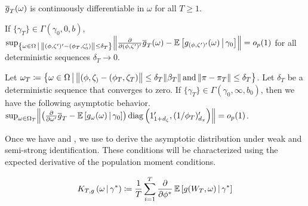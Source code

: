 \documentclass[11pt, letterpaper, twoside, final]{article}
\begin{document}
\begin{appendices}
  
  
  \begin{assump}[GMM 2*]\label{ass:GMM2}
  \begin{assumplist}
    \item $\overline{g}_T(\omega)$ is continuously differentiable in $\omega$ for all $T \geq 1$. 
      \label{ass:GMM2a}
    \item If $\{\gamma_T\} \in \Gamma\left(\gamma_0, 0, b\right)$, $\sup_{\left\lbrace \omega \in \Omega \mvert
      \norm*{(\phi, \zeta')' - (\phi_T, \zeta_0')} \leq \delta_T \right\rbrace}
      \norm*{\frac{\partial}{\partial (\phi, \zeta')'} \sampmom(\omega) - \E\left[\popmom_{(\phi,
      \zeta')'}(\omega) \mvert \gamma_0\right]} = o_p(1)$ for all deterministic sequences $\delta_T \to 0$.
      \label{ass:GMM2b}
    \item Let $\omega_T \coloneqq \left\lbrace \omega \in \Omega \mvert \norm*{(\phi, \zeta_) - (\phi_T, \zeta_T)}
      \leq \delta_T \norm*{\beta_T}\, \text{and}\, \norm*{\pi - \pi_T} \leq \delta_T \right\rbrace$. Let
      $\delta_T$ be a deterministic sequence that converges to zero. If $\{\gamma_T \} \in
      \Gamma\left(\gamma_0, \infty, b_0\right)$, then we have the following asymptotic behavior.
      $\sup_{\omega \in \Omega_T} \norm*{\left(\frac{\partial}{\partial \omega'} \overline{g}_T -
      \E\left[g_{\omega}(\omega) \mvert \gamma_0\right]\right) \diag\left(1_{1+d_\zeta}',
      (1/\phi_T)_{d_{\pi}}'\right)} = o_p(1)$. 
      \label{ass:GMM2c}
  \end{assumplist}
  \end{assump}
  
  Once we have  and , we use  to derive the asymptotic
  distribution under weak and semi-strong identification.
  These conditions will be characterized using the expected derivative of the population moment conditions. 
  
  \begin{defn}
    \label{defn:moment_derivative_func}
    \begin{equation}
      K_{T,g}\left(\omega \,\middle\vert\, \gamma^{*}\right) \coloneqq \frac{1}{T} \sum_{i=1}^T \frac{\partial}{\partial
      \phi^{*}} \operatorname{\mathbb{E}} \left[ g(W_T, \omega) \,\middle\vert\, \gamma^{*} \right]
    \end{equation}
  \end{defn}
  

\end{appendices}
\end{document}
